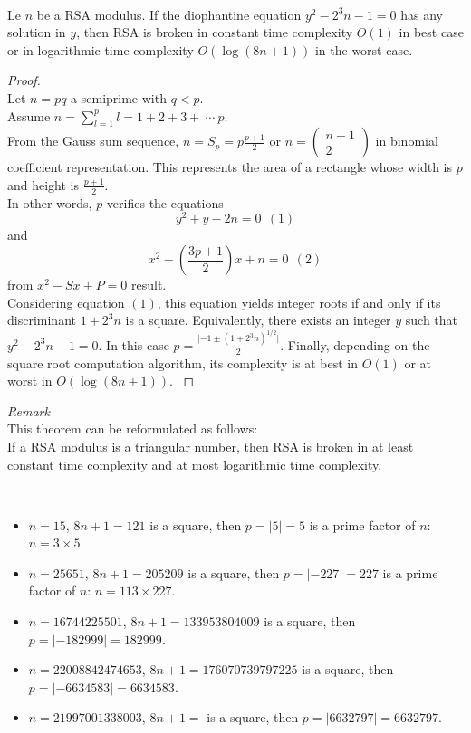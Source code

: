 \documentclass[sigconf,balance=false]{acmart}
\begin{document}
\begin{theorem} \ \\ \rm{
Le $n$ be a RSA modulus. If the diophantine equation $y^2-2^3n-1=0$ has any solution in $y$, then RSA is broken in constant time complexity $O(1)$ in best case or in logarithmic time complexity $O\left(\log(8n+1)\right)$ in the worst case.
}
\end{theorem}
\begin{proof} \ \\ \rm{
Let $n=pq$ a semiprime with $q<p$.\\
Assume $\displaystyle n=\sum_{l=1}^{p}l=1+2+3+ \ \cdots \ p$.\\ From the Gauss sum sequence, $n=S_{p}=\displaystyle p\frac{p+1}{2}$ or $n=\displaystyle\left( \begin{array}{c}
n+1 \\ 
2
\end{array}\right)$ in binomial coefficient representation. This represents the area of a rectangle whose width is $p$ and height is $\frac{p+1}{2}$.\\ In other words, $p$ verifies the equations $$y^{2}+y-2n=0 \ \ (1)$$ and $$x^2-\displaystyle\left(\frac{3p+1}{2}\right)x+\displaystyle n=0 \ \ (2)$$ from $x^2-Sx+P=0$ result.\\
Considering equation $(1)$, this equation yields integer roots if and only if its discriminant $1+2^3n$ is a square. Equivalently, there exists an integer $y$ such that $y^2-2^3n-1=0$. In this case $\displaystyle p=\frac{\lvert-1\pm\left(1+2^3n\right)^{1/2}\rvert}{2}$. Finally, depending on the square root computation algorithm, its complexity is at best in $O(1)$ or at worst in $O\left(\log(8n+1)\right)$.
}
\end{proof}
\textit{Remark} \ \\ \rm{
This theorem can be reformulated as follows:\\
If a RSA modulus is a triangular number, then RSA is broken in at least constant time complexity and at most logarithmic time complexity.
}

\begin{example} \ \rm{
\begin{itemize}
\item $n=15$, $8n+1=121$ is a square, then $p=\lvert 5 \vert=5$ is a prime factor of $n$: $n=3\times 5$.
\item $n=25651$, $8n+1=205209$ is a square, then $p=\lvert -227\rvert=227$ is a prime factor of $n$: $n=113\times 227$.
\item $n=16744225501$, $8n+1=133953804009$ is a square, then $p=\lvert -182999\rvert=182999$.
\item $n=22008842474653$, $8n+1=176070739797225$ is a square, then $p=\lvert -6634583\rvert=6634583$.
\item $n=21997001338003$, $8n+1=$ is a square, then $p=\lvert 6632797\rvert=6632797$.
\end{itemize}
}
\end{example}
\end{document}
